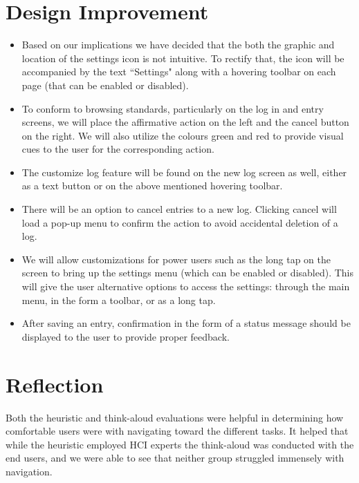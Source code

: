 \documentclass[pdftex,12pt,a4paper]{report}
\begin{document}
\chapter{Design Improvement}

\begin{itemize}
\item{Based on our implications we have decided that the both the graphic and location of the settings icon is not intuitive. To rectify that, the icon will be accompanied by the text ``Settings" along with a hovering toolbar on each page (that can be enabled or disabled).}

\item{To conform to browsing standards, particularly on the log in and entry screens, we will place the affirmative action on the left and the cancel button on the right. We will also utilize the colours green and red to provide visual cues to the user for the corresponding action.}

\item{The customize log feature will be found on the new log screen as well, either as a text button or on the above mentioned hovering toolbar.}

\item{There will be an option to cancel entries to a new log. Clicking cancel will load a pop-up menu to confirm the action to avoid accidental deletion of a log.}

\item{We will allow customizations for power users such as the long tap on the screen to bring up the settings menu (which can be enabled or disabled). This will give the user alternative options to access the settings: through the main menu, in the form a toolbar, or as a long tap.}

\item{After saving an entry, confirmation in the form of a status message should be displayed to the user to provide proper feedback.}

\end{itemize}

\chapter{Reflection}

Both the heuristic and think-aloud evaluations were helpful in determining how comfortable users were with navigating toward the different tasks. It helped that while the heuristic employed HCI experts the think-aloud was conducted with the end users, and we were able to see that neither group struggled immensely with navigation. \\
\end{document}
